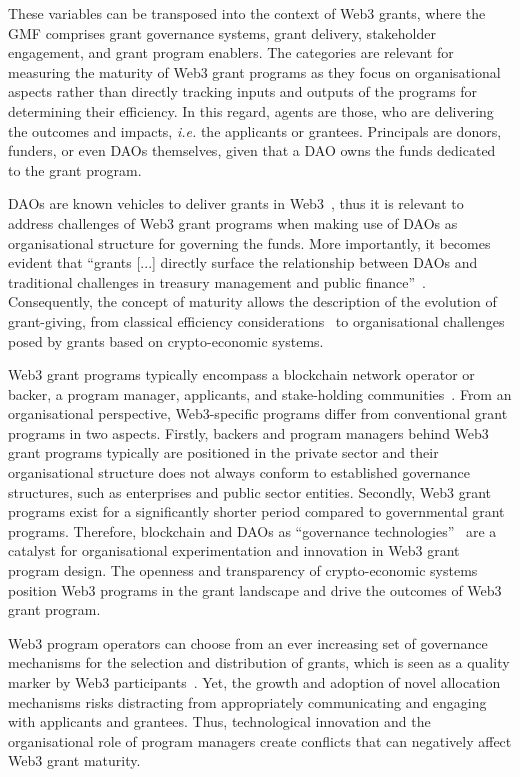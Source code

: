 \documentclass[conference]{IEEEtran}
\begin{document}
These variables can be transposed into the context of Web3 grants, where the GMF comprises grant governance systems, grant delivery, stakeholder engagement, and grant program enablers. The categories are relevant for measuring the maturity of Web3 grant programs as they focus on organisational aspects rather than directly tracking inputs and outputs of the programs for determining their efficiency. In this regard, agents are those, who are delivering the outcomes and impacts, \textit{i.e.} the applicants or grantees. Principals are donors, funders, or even DAOs themselves, given that a DAO owns the funds dedicated to the grant program.

DAOs are known vehicles to deliver grants in Web3~\cite{austgen_dao_2023}, thus it is relevant to address challenges of Web3 grant programs when making use of DAOs as organisational structure for governing the funds. More importantly, it becomes evident that ``grants [...] directly surface the relationship between DAOs and traditional challenges in treasury management and public finance''~\cite[p.~27]{tan_open_2023}. Consequently, the concept of maturity allows the description of the evolution of grant-giving, from classical efficiency considerations~\cite{holmstrom_agency_1989} to organisational challenges posed by grants based on crypto-economic systems.

Web3 grant programs typically encompass a blockchain network operator or backer, a program manager, applicants, and stake-holding communities~\cite{gilbert_sustainable_2019,howell_financing_2017}. From an organisational perspective, Web3-specific programs differ from conventional grant programs in two aspects. Firstly, backers and program managers behind Web3 grant programs typically are positioned in the private sector and their organisational structure does not always conform to established governance structures, such as enterprises and public sector entities. Secondly, Web3 grant programs exist for a significantly shorter period compared to governmental grant programs. Therefore, blockchain and DAOs as ``governance technologies''~\cite{brekke_hacker-engineers_2021,shermin_disrupting_2017}  are a catalyst for organisational experimentation and innovation in Web3 grant program design. The openness and transparency of crypto-economic systems~\cite[p.~54]{santos_dao_2018} position Web3 programs in the grant landscape and drive the outcomes of Web3 grant program.

Web3 program operators can choose from an ever increasing set of governance mechanisms for the selection and distribution of grants, which is seen as a quality marker by Web3 participants~\cite{owocki_gitcoin_2024}. Yet, the growth and adoption of novel allocation mechanisms risks distracting from appropriately communicating and engaging with applicants and grantees. Thus, technological innovation and the organisational role of program managers create conflicts that can negatively affect Web3 grant maturity.
\end{document}
